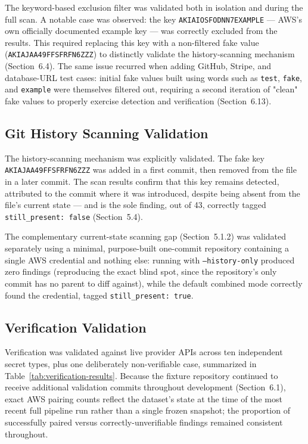 \documentclass[12pt]{article}
\begin{document}
The keyword-based exclusion filter was validated both in isolation and during the full scan. A notable case was observed: the key \texttt{AKIAIOSFODNN7EXAMPLE} --- AWS's own officially documented example key --- was correctly excluded from the results. This required replacing this key with a non-filtered fake value (\texttt{AKIAJAA49FFSFRFN6ZZZ}) to distinctly validate the history-scanning mechanism (Section~6.4). The same issue recurred when adding GitHub, Stripe, and database-URL test cases: initial fake values built using words such as \texttt{test}, \texttt{fake}, and \texttt{example} were themselves filtered out, requiring a second iteration of "clean" fake values to properly exercise detection and verification (Section~6.13).

\subsection{Git History Scanning Validation}
\label{subsec:history-validation}

The history-scanning mechanism was explicitly validated. The fake key \texttt{AKIAJAA49FFSFRFN6ZZZ} was added in a first commit, then removed from the file in a later commit. The scan results confirm that this key remains detected, attributed to the commit where it was introduced, despite being absent from the file's current state --- and is the sole finding, out of 43, correctly tagged \texttt{still\_present: false} (Section~5.4).

The complementary current-state scanning gap (Section~5.1.2) was validated separately using a minimal, purpose-built one-commit repository containing a single AWS credential and nothing else: running with \texttt{--history-only} produced zero findings (reproducing the exact blind spot, since the repository's only commit has no parent to diff against), while the default combined mode correctly found the credential, tagged \texttt{still\_present: true}.

\subsection{Verification Validation}

Verification was validated against live provider APIs across ten independent secret types, plus one deliberately non-verifiable case, summarized in Table~\ref{tab:verification-results}. Because the fixture repository continued to receive additional validation commits throughout development (Section~6.1), exact AWS pairing counts reflect the dataset's state at the time of the most recent full pipeline run rather than a single frozen snapshot; the proportion of successfully paired versus correctly-unverifiable findings remained consistent throughout.
\end{document}
